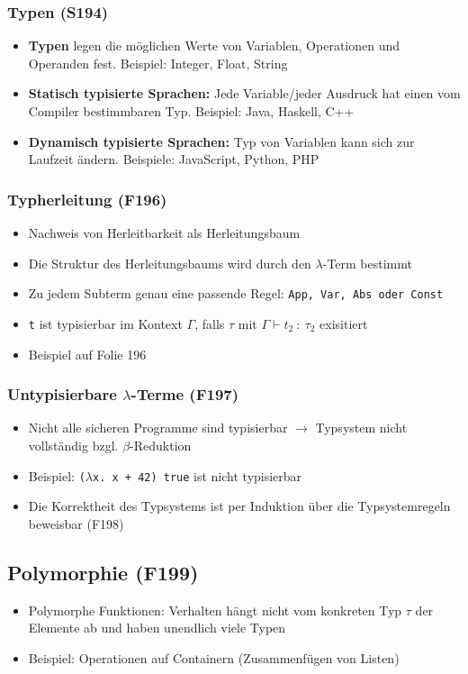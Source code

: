 \subsubsection{Typen (S194)}
\begin{itemize}
	\item \textbf{Typen} legen die möglichen Werte von Variablen, Operationen und Operanden fest. Beispiel: Integer, Float, String
	\item \textbf{Statisch typisierte Sprachen:} Jede Variable/jeder Ausdruck hat einen vom Compiler bestimmbaren Typ. Beispiel: Java, Haskell, C++
	\item \textbf{Dynamisch typisierte Sprachen:} Typ von Variablen kann sich zur Laufzeit ändern. Beispiele: JavaScript, Python, PHP
\end{itemize}

\subsubsection{Typherleitung (F196)}
\begin{itemize}
	\item Nachweis von Herleitbarkeit als Herleitungsbaum
	\item Die Struktur des Herleitungsbaums wird durch den \(\lambda\)-Term bestimmt
	\item Zu jedem Subterm genau eine passende Regel: \texttt{App, Var, Abs oder Const}
	\item \texttt{t} ist typisierbar im Kontext \(\Gamma\), falls \(\tau\) mit \(\Gamma\vdash t_2~:~\tau_2\) exisitiert
	\item Beispiel auf Folie 196
\end{itemize}

\subsubsection{Untypisierbare \(\lambda\)-Terme (F197)}
\begin{itemize}
	\item Nicht alle sicheren Programme sind typisierbar \(\rightarrow\) Typsystem nicht vollständig bzgl. \(\beta\)-Reduktion
	\item Beispiel: \texttt{(\(\lambda\)x. x + 42) true} ist nicht typisierbar
	\item Die Korrektheit des Typsystems ist per Induktion über die Typsystemregeln beweisbar (F198)
\end{itemize}


\subsection{Polymorphie (F199)}
\begin{itemize}
	\item Polymorphe Funktionen: Verhalten hängt nicht vom konkreten Typ \(\tau\) der Elemente ab und haben unendlich viele Typen
	\item Beispiel: Operationen auf Containern (Zusammenfügen von Listen)
\end{itemize}


